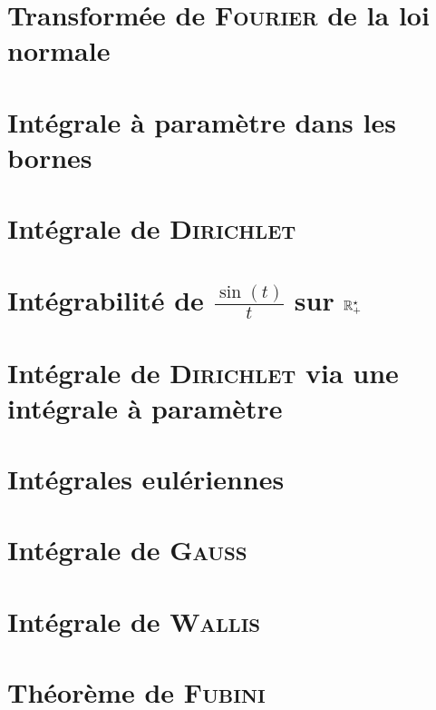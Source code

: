 \section{Transformée de \textsc{Fourier} de la loi normale}


\section{Intégrale à paramètre dans les bornes}


\section{Intégrale de \textsc{Dirichlet}}


\section{Intégrabilité de \texorpdfstring{$\frac{\sin(t)}{t}$ sur $\mathbb{R}^\star_+$}{sin(t)/t sur R+*}}


\section{Intégrale de \textsc{Dirichlet} via une intégrale à paramètre}


\section{Intégrales eulériennes}


\section{Intégrale de \textsc{Gauss}}


\section{Intégrale de \textsc{Wallis}} \label{integrale_wallis}


\section{Théorème de \textsc{Fubini}}


